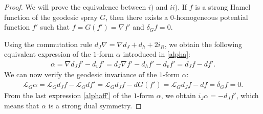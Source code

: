 \documentclass[10pt,a4paper]{amsart}
\begin{document}
\begin{proof}
We will prove the equivalence between $i)$ and $ii)$. If $f$ is a strong Hamel function of the geodesic spray $G$, then there exists a $0$-homogeneous potential function $f'$ such that $f=G(f')=\nabla f'$ and $\delta_Gf=0$.

Using the commutation rule $d_J\nabla=\nabla d_J+d_h+2i_R$, we obtain the following equivalent expression of the $1$-form $\alpha$ introduced in \eqref{alpha}:
\begin{eqnarray}
\alpha=\nabla d_Jf'-d_vf'=d_J\nabla f'-d_hf'-d_vf'=d_Jf-df'. \label{alphaff'}
\end{eqnarray} 
We can now verify the geodesic invariance of the $1$-form $\alpha$:
\begin{eqnarray*}
\mathcal{L}_{G}\alpha=\mathcal{L}_{G}d_Jf-\mathcal{L}_{G}df'=\mathcal{L}_{G}d_Jf-dG(f')=\mathcal{L}_{G}d_Jf-df=\delta_Gf=0.
\end{eqnarray*}
From the last expression \eqref{alphaff'} of the $1$-form $\alpha$, we obtain $i_J\alpha=-d_Jf'$, which means that $\alpha$ is a strong dual symmetry.


\end{proof}
\end{document}
